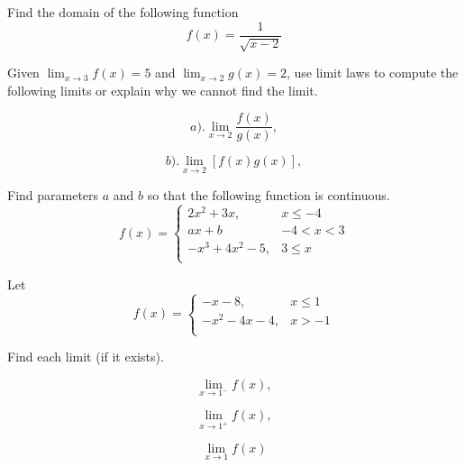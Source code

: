 \documentclass[11pt]{exam}
\begin{document}
\begin{questions}

\addpoints
\question[4] Find the domain of the following function
\[
f(x)=\frac{1}{\sqrt{x-2}}
\]
\vfill


\addpoints
\question[6] 
Given $\lim_{x\to 3} f(x)=5$ and $\lim_{x\to 2} g(x)=2$, use limit laws to compute the following limits or explain why we cannot find the limit.
 
\begin{minipage}{.3\linewidth}
\begin{equation*}
a).  \lim_{x\to 2} \frac{f(x)}{g(x)},
\end{equation*}
\end{minipage}%
\begin{minipage}{.6\linewidth}
\begin{equation*}
b).  \lim_{x\to 2}[f(x)g(x)],
\end{equation*}
\end{minipage}%




\vfill



\question[10] Find parameters $a$ and $b$ so that the following function is continuous. 
\[   f(x)=\left\{
\begin{array}{ll}
      2x^{2}+3x,  & x\leq -4 \\
      ax+b  & -4 < x < 3 \\
      -x^{3}+4x^{2}-5,  & 3\leq x   \\ 
\end{array} 
\right. \]
\vfill



\newpage

\addpoints
\question[6] 
Let 
\[   f(x)=\left\{
\begin{array}{ll}
      -x-8, & x\leq 1 \\
      -x^{2}-4x-4,     & x > -1\\
\end{array} 
\right. \]


Find each limit (if it exists).

\begin{minipage}{.3\linewidth}
\begin{equation*}
 \lim_{x\to 1^{-}}f(x),
\end{equation*}
\end{minipage}%
\begin{minipage}{.3\linewidth}
\begin{equation*}
 \lim_{x\to 1^{+}}f(x),
\end{equation*}
\end{minipage}%
\begin{minipage}{.3\linewidth}
\begin{equation*}
 \lim_{x\to 1}f(x)
\end{equation*}
\end{minipage}


\end{questions}
\end{document}
